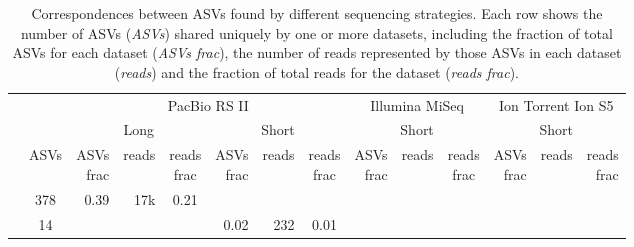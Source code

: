 \documentclass[
]{article}
\begin{document}
\setlength{\tabcolsep}{1ex}





\begin{table}

\caption[Correspondences between ASVs found by different sequencing strategies]{\label{tab:venn-table-asv}Correspondences between ASVs found by different sequencing strategies. Each row shows the number of ASVs (\emph{ASVs}) shared uniquely by one or more datasets, including the fraction of total ASVs for each dataset (\emph{ASVs frac}), the number of reads represented by those ASVs in each dataset (\emph{reads}) and the fraction of total reads for the dataset (\emph{reads frac}).}
\centering
\begin{tabular}[t]{rcrrcrrcrrcrrr}
\toprule
\multicolumn{2}{c}{ } & \multicolumn{6}{c}{PacBio RS II} & \multicolumn{3}{c}{Illumina MiSeq} & \multicolumn{3}{c}{Ion Torrent Ion S5} \\
\cmidrule(l{3pt}r{3pt}){3-8} \cmidrule(l{3pt}r{3pt}){9-11} \cmidrule(l{3pt}r{3pt}){12-14}
\multicolumn{2}{c}{ } & \multicolumn{3}{c}{Long} & \multicolumn{3}{c}{Short} & \multicolumn{3}{c}{Short} & \multicolumn{3}{c}{Short} \\
\cmidrule(l{3pt}r{3pt}){3-5} \cmidrule(l{3pt}r{3pt}){6-8} \cmidrule(l{3pt}r{3pt}){9-11} \cmidrule(l{3pt}r{3pt}){12-14}
\makecell[c]{\\} & ASVs & \makecell[c]{ASVs\\frac} & reads & \makecell[c]{reads\\frac} & \makecell[c]{ASVs\\frac} & reads & \makecell[c]{reads\\frac} & \makecell[c]{ASVs\\frac} & reads & \makecell[c]{reads\\frac} & \makecell[c]{ASVs\\frac} & reads & \makecell[c]{reads\\frac}\\
\midrule
 & 378 & 0.39 & 17k & 0.21 & \cellcolor{gray}{  } & \cellcolor{gray}{  } & \cellcolor{gray}{  } & \cellcolor{gray}{  } & \cellcolor{gray}{  } & \cellcolor{gray}{  } & \cellcolor{gray}{  } & \cellcolor{gray}{  } & \cellcolor{gray}{  }\\
 & 14 & \cellcolor{gray}{  } & \cellcolor{gray}{  } & \cellcolor{gray}{  } & 0.02 & 232 & 0.01 & \cellcolor{gray}{  } & \cellcolor{gray}{  } & \cellcolor{gray}{  } & \cellcolor{gray}{  } & \cellcolor{gray}{  } & \cellcolor{gray}{  }\\

\end{tabular}
\end{table}
\end{document}
